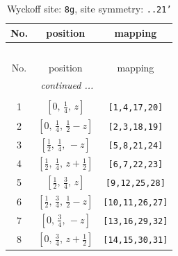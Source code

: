 \documentclass[fleqn,8pt]{jsarticle}
\begin{document}
\begin{longtable}{ccc}
\caption{Wyckoff site: {\tt 8g}, site symmetry: {\tt ..21'}}
 \\
 \hline \hline
No. & position & mapping \\ \hline \endfirsthead

\multicolumn{2}{l}{\tablename\ \thetable{}} \\
 \hline \hline
No. & position & mapping \\ \hline \endhead

 \hline \hline
\multicolumn{2}{r}{\footnotesize\it continued ...} \\ \endfoot

 \hline \hline
\multicolumn{2}{r}{} \\ \endlastfoot

1 & $\left[ 0,\, \frac{1}{4},\, z \right]$ & {\tt [1,4,17,20]} \\ \hline
2 & $\left[ 0,\, \frac{1}{4},\, \frac{1}{2} - z \right]$ & {\tt [2,3,18,19]} \\ \hline
3 & $\left[ \frac{1}{2},\, \frac{1}{4},\, - z \right]$ & {\tt [5,8,21,24]} \\ \hline
4 & $\left[ \frac{1}{2},\, \frac{1}{4},\, z + \frac{1}{2} \right]$ & {\tt [6,7,22,23]} \\ \hline
5 & $\left[ \frac{1}{2},\, \frac{3}{4},\, z \right]$ & {\tt [9,12,25,28]} \\ \hline
6 & $\left[ \frac{1}{2},\, \frac{3}{4},\, \frac{1}{2} - z \right]$ & {\tt [10,11,26,27]} \\ \hline
7 & $\left[ 0,\, \frac{3}{4},\, - z \right]$ & {\tt [13,16,29,32]} \\ \hline
8 & $\left[ 0,\, \frac{3}{4},\, z + \frac{1}{2} \right]$ & {\tt [14,15,30,31]} \\
\end{longtable}
\renewcommand{\arraystretch}{1.2}
\end{document}
